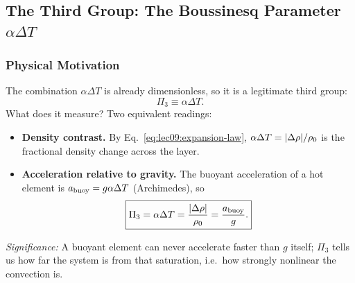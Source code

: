
\subsection{The Third Group: The Boussinesq Parameter \texorpdfstring{$\alpha\Delta T$}{alpha dT}}
\label{sec:lec09:boussinesq}

\subsubsection*{Physical Motivation}
The combination $\alpha\Delta T$ is already dimensionless, so it is a
legitimate third group:
\begin{equation}
    \Pi_3\equiv\alpha\Delta T.
    \label{eq:lec09:pi3-definition}
\end{equation}
What does it measure? Two equivalent readings:
\begin{itemize}
    \item \textbf{Density contrast.} By Eq.~\eqref{eq:lec09:expansion-law},
    $\alpha\Delta T=\abs{\Delta\rho}/\rho_0$ is the fractional density change
    across the layer.
    \item \textbf{Acceleration relative to gravity.} The buoyant acceleration
    of a hot element is $a_{\rm buoy}=g\alpha\Delta T$ (Archimedes), so
    \begin{equation}
        \boxed{
        \Pi_3=\alpha\Delta T
        =\frac{\abs{\Delta\rho}}{\rho_0}
        =\frac{a_{\rm buoy}}{g}.
        }
        \label{eq:lec09:pi3-meaning}
    \end{equation}
\end{itemize}
\textit{Significance:} A buoyant element can never accelerate faster than $g$
itself; $\Pi_3$ tells us how far the system is from that saturation, i.e.\ how
strongly nonlinear the convection is.

